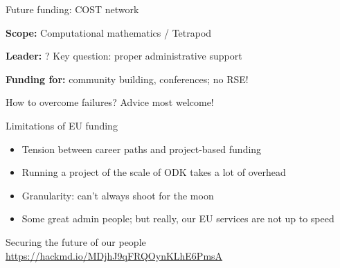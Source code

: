 \documentclass[svgnames]{beamer}
\begin{document}
\begin{frame}{Future funding: COST network}

  \textbf{Scope:} Computational mathematics / Tetrapod

  \textbf{Leader:} ? Key question: proper administrative support
  \bigskip

  \textbf{Funding for:} community building, conferences; no RSE!
\end{frame}

\begin{frame}
  \begin{block}{How to overcome failures?}\pause
    Advice most welcome!\pause
  \end{block}
  \bigskip

  \begin{block}{Limitations of EU funding}
    \begin{itemize}
    \item Tension between career paths and project-based funding
      \bigskip\pause
    \item Running a project of the scale of ODK takes a lot of overhead
    \item Granularity: can't always shoot for the moon
      \bigskip\pause
    \item Some great admin people; but really, our EU services are not up to speed
    \end{itemize}
  \end{block}
\end{frame}

\begin{frame}{Securing the future of our people}
  \url{https://hackmd.io/MDjhJ9qFRQOynKLhE6PmsA}
\end{frame}
\end{document}

